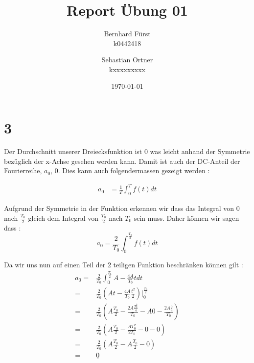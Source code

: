 \documentclass{article}
\author{ Bernhard Fürst \\ k0442418 \and Sebastian Ortner \\ kxxxxxxxxx}
\title{Report Übung 01}
\date{\today}
\begin{document}
    \maketitle
    \section*{3}
    Der Durchschnitt unserer Dreiecksfunktion ist $0$ was leicht anhand der Symmetrie bezüglich der x-Achse gesehen werden kann. Damit ist auch der DC-Anteil der Fourierreihe, $a_0$, $0$.
    Dies kann auch folgendermassen gezeigt werden :
    
    \begin{eqnarray*}
        a_{0} &=\frac{1}{T}\int_{0}^{T}f(t)dt 
    \end{eqnarray*}

Aufgrund der Symmetrie in der Funktion erkennen wir dass das Integral von $0$ nach $\frac{T_0}{2}$ gleich dem Integral von $\frac{T_0}{2}$ nach $T_0$ sein muss. Daher können wir sagen dass :
\begin{equation}
    a_0=\frac{2}{T_0}\int_{0}^{\frac{T_0}{2}}f(t)dt
\end{equation}

Da wir uns nun auf einen Teil der 2 teiligen Funktion beschränken können gilt :
\begin{eqnarray*}
    a_0=&\frac{2}{T_0}\int_{0}^{\frac{T_0}{2}}A-\frac{4A}{T_0}tdt \\
    =&\frac{2}{T_0}(At-\frac{4A}{T_0}\frac{t^2}{2})\big |_0^{\frac{T_0}{2}}\\
    =&\frac{2}{T_0}(A\frac{T_0}{2}-\frac{2A\frac{T_0^2}{4}}{T_0}-A0-\frac{2A\frac{0}{4}}{T_0})\\
    =&\frac{2}{T_0}(A\frac{T_0}{2}-\frac{AT_0^2}{2T_0}-0-0)\\
    =&\frac{2}{T_0}(A\frac{T_0}{2}-A\frac{T_0}{2}-0) \\ =& \underline{0}
\end{eqnarray*}
\end{document}
